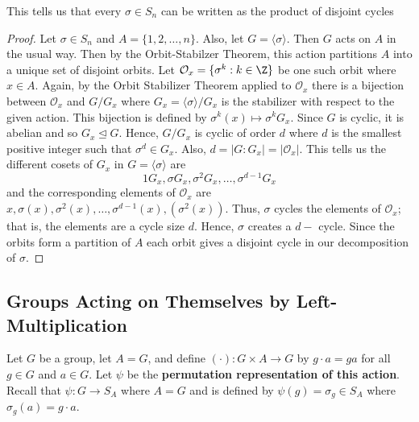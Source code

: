 \begin{corollary}
    This tells us that every \( \sigma \in {S}_{n} \) can be written as the product of disjoint cycles
\end{corollary}
\begin{proof}
Let \( \sigma \in {S}_{n} \) and \( A = \{  1,2,\dots, n \}  \). Also, let \( G = \langle  \sigma \rangle \). Then \( G  \) acts on \( A  \) in the usual way. Then by the Orbit-Stabilzer Theorem, this action partitions \( A  \) into a unique set of disjoint orbits. Let \( {\mathcal{O}}_{x}  =  \{  \sigma^{k} : k \in \Z \}  \) be one such orbit where \( x \in A \). Again, by the Orbit Stabilizer Theorem applied to \( {\mathcal{O}}_{x}  \) there is a bijection between \( {\mathcal{O}}_{x}  \) and \( G / {G}_{x} \) where \( {G}_{x} = \langle \sigma   \rangle / {G}_{x} \) is the stabilizer with respect to the given action. This bijection is defined by \( \sigma^{k}(x) \mapsto \sigma^{k} {G}_{x} \). Since \( G  \) is cyclic, it is abelian and so \( {G}_{x} \trianglelefteq G  \). Hence, \( G / {G}_{x} \) is cyclic of order \( d  \) where \( d  \) is the smallest positive integer such that \( \sigma^{d} \in {G}_{x} \). Also, \( d = | G : {G}_{x} | = | {\mathcal{O}}_{x} |    \). This tells us the different cosets of \( {G}_{x} \) in \( G = \langle \sigma  \rangle \) are   
\[  1 {G}_{x}, \sigma {G}_{x} , \sigma^{2} {G}_{x}, \dots, \sigma^{d-1} {G}_{x} \]
and the corresponding elements of \( {\mathcal{O}}_{x}  \) are \( x, \sigma(x) , \sigma^{2}(x), \dots, \sigma^{d-1}(x) ,  (\sigma^{2}(x)) \). Thus, \( \sigma \) cycles the elements of \( {\mathcal{O}}_{x} \); that is, the elements are a cycle size \( d  \). Hence, \( \sigma \) creates a \( d-\) cycle. Since the orbits form a partition of \( A  \) each orbit gives a disjoint cycle in our decomposition of \( \sigma \).
\end{proof}

\subsection{Groups Acting on Themselves by Left-Multiplication}

Let \( G  \) be a group, let \( A = G  \), and define \( (\cdot) : G \times A \to G  \) by \( g \cdot a = ga  \) for all \( g \in G  \) and \( a \in G  \). Let \( \psi  \) be the \textbf{permutation representation of this action}. Recall that \( \psi : G \to {S}_{A} \) where \( A = G  \) and is defined by \( \psi(g) = {\sigma}_{g} \in {S}_{A} \) where \( {\sigma}_{g}(a) = g \cdot a  \). 

